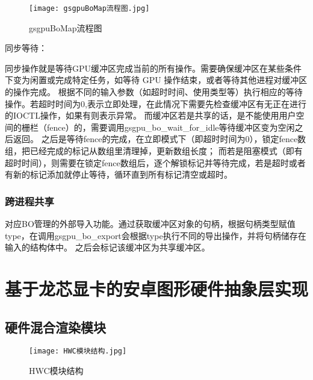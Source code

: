 \begin{figure}[h]
  \centering
  \texttt{[image: gsgpuBoMap流程图.jpg]}
  \caption{gsgpuBoMap流程图}
  \label{fig:gsgpuBoMap流程图}
\end{figure}

同步等待：

同步操作就是等待GPU缓冲区完成当前的所有操作。需要确保缓冲区在某些条件下变为闲置或完成特定任务，如等待 GPU 操作结束，或者等待其他进程对缓冲区的操作完成。
根据不同的输入参数（如超时时间、使用类型等）执行相应的等待操作。若超时时间为0,表示立即处理，在此情况下需要先检查缓冲区有无正在进行的IOCTL操作，如果有则表示异常。
而缓冲区若是共享的话，是不能使用用户空间的栅栏（fence）的，需要调用gsgpu\_bo\_wait\_for\_idle等待缓冲区变为空闲之后返回。
之后是等待fence的完成，在立即模式下（即超时时间为0），锁定fence数组，把已经完成的标记从数组里清理掉，更新数组长度；
而若是阻塞模式（即有超时时间），则需要在锁定fence数组后，逐个解锁标记并等待完成，若是超时或者有新的标记添加就停止等待，循环直到所有标记清空或超时。

\subsubsection{跨进程共享}
对应BO管理的外部导入功能。通过获取缓冲区对象的句柄，根据句柄类型赋值type，在调用gsgpu\_bo\_export会根据type执行不同的导出操作，并将句柄储存在输入的结构体中。
之后会标记该缓冲区为共享缓冲区。



\section{基于龙芯显卡的安卓图形硬件抽象层实现}

\subsection{硬件混合渲染模块}

\begin{figure}[h]
  \centering
  \texttt{[image: HWC模块结构.jpg]}
  \caption{HWC模块结构}
  \label{fig:HWC模块结构}
\end{figure}

